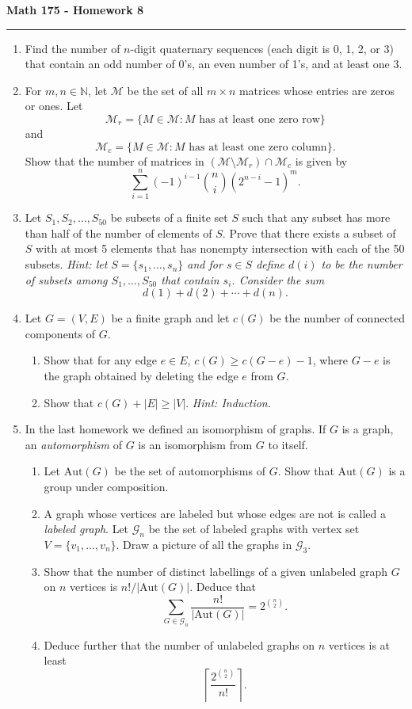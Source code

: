 \documentclass[11pt,letterpaper]{report}
\newcommand{\naturals}{\mathbb{N}}
\newcommand{\mcal}[1]{\mathcal{#1}}
\newcommand{\Aut}{\text{Aut}}
\begin{document}
\begin{center}
{\bf \Large Math 175 - Homework 8}
\vspace{0.2cm}
\hrule
\end{center}

\begin{enumerate}
	\item Find the number of $n$-digit quaternary sequences (each digit is 0, 1, 2, or 3) that contain an odd number of 0's, an even number of 1's, and at least one 3.
	\vfill
	\item For $m, n\in \naturals$, let $\mcal{M}$ be the set of all $m\times n$ matrices whose entries are zeros or ones. Let 
	\[
	\mcal{M}_r = \{M\in \mcal{M}: M\text{ has at least one zero row}\}
	\]
	and
	\[
	\mcal{M}_c = \{M\in \mcal{M}: M\text{ has at least one zero column}\}.
	\]
	Show that the number of matrices in $(\mcal{M}\setminus \mcal{M}_r)\cap \mcal{M}_c$ is given by
	\[
	\sum_{i=1}^n(-1)^{i-1}\binom{n}{i}(2^{n-i}-1)^m.
	\]
	\vfill
	\item Let $S_1, S_2, \ldots, S_{50}$ be subsets of a finite set $S$ such that any subset has more than half of the number of elements of $S$. Prove that there exists a subset of $S$ with at most 5 elements that has nonempty intersection with each of the 50 subsets. \textit{Hint: let $S = \{s_1, \ldots, s_n\}$ and for $s\in S$ define $d(i)$ to be the number of subsets among $S_1, \ldots, S_{50}$ that contain $s_i$. Consider the sum}
	\[
	d(1) + d(2) + \cdots +d(n).
	\]
	\vfill
	\item Let $G = (V, E)$ be a finite graph and let $c(G)$ be the number of connected components of $G$.
	\begin{enumerate}
		\item Show that for any edge $e\in E$, $c(G) \geq c(G-e)-1$, where $G - e$ is the graph obtained by deleting the edge $e$ from $G$.
		\vfill
		\item Show that $c(G) + |E| \geq |V|$. \textit{Hint: Induction.}
	\end{enumerate}
	\vfill\pagebreak

	\item In the last homework we defined an isomorphism of graphs. If $G$ is a graph, an \textit{automorphism} of $G$ is an isomorphism from $G$ to itself.
	\begin{enumerate}
		\item Let $\Aut(G)$ be the set of automorphisms of $G$. Show that $\Aut(G)$ is a group under composition.
		\item A graph whose vertices are labeled but whose edges are not is called a \textit{labeled graph}. Let $\mcal{G}_n$ be the set of labeled graphs with vertex set $V = \{v_1, \ldots, v_n\}$. Draw a picture of all the graphs in $\mcal{G}_3$.
		\item Show that the number of distinct labellings of a given unlabeled graph $G$ on $n$ vertices is $n!/|\Aut(G)|$. Deduce that
		\[
		\sum_{G\in \mcal{G}_n}\frac{n!}{|\Aut(G)|} = 2^{\binom{n}{2}}.
		\]
		\item Deduce further that the number of unlabeled graphs on $n$ vertices is at least
		\[
		\left\lceil \frac{2^{\binom{n}{2}}}{n!}\right\rceil.
		\]
	\end{enumerate}
\end{enumerate}
\end{document}
